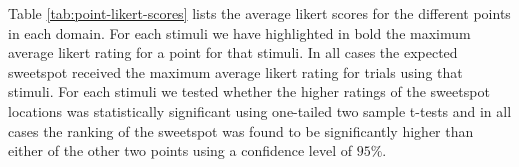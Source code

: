 \documentclass[11pt,letterpaper]{article}
\begin{document}
Table \ref{tab:point-likert-scores} lists the average likert scores for the different points in each domain. For each stimuli we have highlighted in bold the maximum average likert rating for a point for that stimuli. In all cases the expected sweetspot received the maximum average likert rating for trials using that stimuli. For each stimuli we tested whether the higher ratings of the sweetspot locations was statistically significant using one-tailed two sample t-tests and in all cases the ranking of the sweetspot was found to be significantly higher than either of the other two points using a confidence level of $95\%$. 
\end{document}
